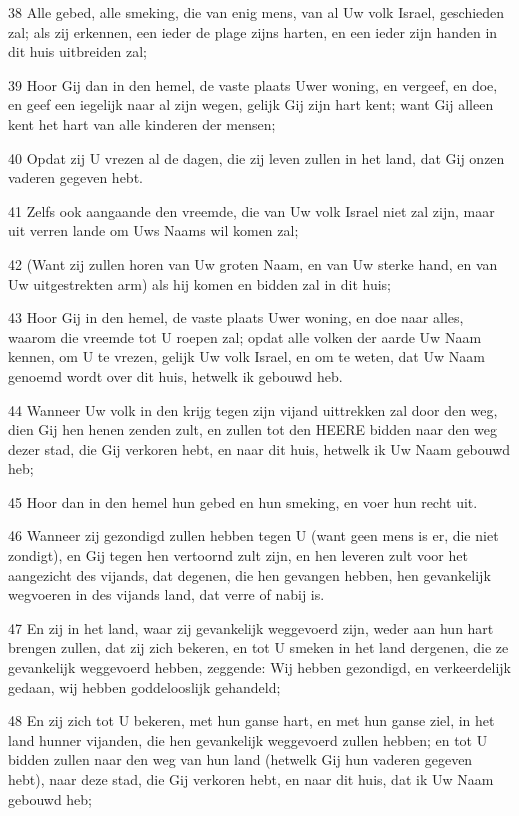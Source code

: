 \par 38 Alle gebed, alle smeking, die van enig mens, van al Uw volk Israel, geschieden zal; als zij erkennen, een ieder de plage zijns harten, en een ieder zijn handen in dit huis uitbreiden zal;
\par 39 Hoor Gij dan in den hemel, de vaste plaats Uwer woning, en vergeef, en doe, en geef een iegelijk naar al zijn wegen, gelijk Gij zijn hart kent; want Gij alleen kent het hart van alle kinderen der mensen;
\par 40 Opdat zij U vrezen al de dagen, die zij leven zullen in het land, dat Gij onzen vaderen gegeven hebt.
\par 41 Zelfs ook aangaande den vreemde, die van Uw volk Israel niet zal zijn, maar uit verren lande om Uws Naams wil komen zal;
\par 42 (Want zij zullen horen van Uw groten Naam, en van Uw sterke hand, en van Uw uitgestrekten arm) als hij komen en bidden zal in dit huis;
\par 43 Hoor Gij in den hemel, de vaste plaats Uwer woning, en doe naar alles, waarom die vreemde tot U roepen zal; opdat alle volken der aarde Uw Naam kennen, om U te vrezen, gelijk Uw volk Israel, en om te weten, dat Uw Naam genoemd wordt over dit huis, hetwelk ik gebouwd heb.
\par 44 Wanneer Uw volk in den krijg tegen zijn vijand uittrekken zal door den weg, dien Gij hen henen zenden zult, en zullen tot den HEERE bidden naar den weg dezer stad, die Gij verkoren hebt, en naar dit huis, hetwelk ik Uw Naam gebouwd heb;
\par 45 Hoor dan in den hemel hun gebed en hun smeking, en voer hun recht uit.
\par 46 Wanneer zij gezondigd zullen hebben tegen U (want geen mens is er, die niet zondigt), en Gij tegen hen vertoornd zult zijn, en hen leveren zult voor het aangezicht des vijands, dat degenen, die hen gevangen hebben, hen gevankelijk wegvoeren in des vijands land, dat verre of nabij is.
\par 47 En zij in het land, waar zij gevankelijk weggevoerd zijn, weder aan hun hart brengen zullen, dat zij zich bekeren, en tot U smeken in het land dergenen, die ze gevankelijk weggevoerd hebben, zeggende: Wij hebben gezondigd, en verkeerdelijk gedaan, wij hebben goddelooslijk gehandeld;
\par 48 En zij zich tot U bekeren, met hun ganse hart, en met hun ganse ziel, in het land hunner vijanden, die hen gevankelijk weggevoerd zullen hebben; en tot U bidden zullen naar den weg van hun land (hetwelk Gij hun vaderen gegeven hebt), naar deze stad, die Gij verkoren hebt, en naar dit huis, dat ik Uw Naam gebouwd heb;
